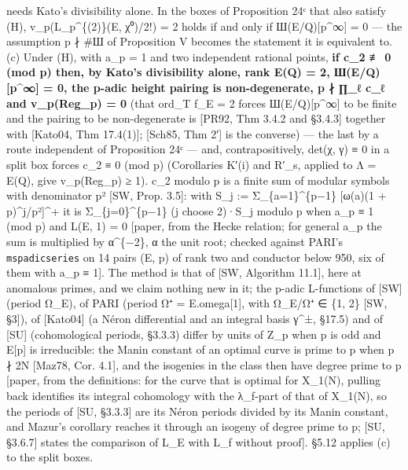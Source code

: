 \documentclass[11pt,a4paper]{article}
\theoremstyle{named}
\begin{document}
needs Kato's divisibility alone. In the boxes of Proposition 24ᶜ that also satisfy (H), v\_p(L\_p\textasciicircum{}\{(2)\}(E, χ⁰)/2!) = 2 holds if and only if Ш(E/Q)[p\textasciicircum{}∞] = 0 — the assumption p ∤ \#Ш of Proposition V becomes the statement it is equivalent to. (c) Under (H), with a\_p = 1 and two independent rational points, \textbf{if c\_2 ≢ 0 (mod p) then, by Kato's divisibility alone, rank E(Q) = 2, Ш(E/Q)[p\textasciicircum{}∞] = 0, the p-adic height pairing is non-degenerate, p ∤ ∏\_ℓ c\_ℓ and v\_p(Reg\_p) = 0} (that ord\_T f\_E = 2 forces Ш(E/Q)[p\textasciicircum{}∞] to be finite and the pairing to be non-degenerate is [PR92, Thm 3.4.2 and §3.4.3] together with [Kato04, Thm 17.4(1)]; [Sch85, Thm 2′] is the converse) — the last by a route independent of Proposition 24ᶜ — and, contrapositively, det(χ, γ) ≡ 0 in a split box forces c\_2 ≡ 0 (mod p) (Corollaries K′(i) and R′\_s, applied to Λ = E(Q), give v\_p(Reg\_p) ≥ 1). c\_2 modulo p is a finite sum of modular symbols with denominator p² [SW, Prop. 3.5]: with S\_j := Σ\_\{a=1\}\textasciicircum{}\{p−1\} [ω(a)(1 + p)\textasciicircum{}j/p²]\textasciicircum{}+ it is Σ\_\{j=0\}\textasciicircum{}\{p−1\} (j choose 2)·S\_j modulo p when a\_p ≡ 1 (mod p) and L(E, 1) = 0 [paper, from the Hecke relation; for general a\_p the sum is multiplied by α\textasciicircum{}\{−2\}, α the unit root; checked against PARI's \texttt{mspadicseries} on 14 pairs (E, p) of rank two and conductor below 950, six of them with a\_p ≡ 1]. The method is that of [SW, Algorithm 11.1], here at anomalous primes, and we claim nothing new in it; the p-adic L-functions of [SW] (period Ω\_E), of PARI (period Ω⁺ = E.omega[1], with Ω\_E/Ω⁺ ∈ \{1, 2\} [SW, §3]), of [Kato04] (a Néron differential and an integral basis γ\textasciicircum{}±, §17.5) and of [SU] (cohomological periods, §3.3.3) differ by units of Z\_p when p is odd and E[p] is irreducible: the Manin constant of an optimal curve is prime to p when p ∤ 2N [Maz78, Cor. 4.1], and the isogenies in the class then have degree prime to p [paper, from the definitions: for the curve that is optimal for X\_1(N), pulling back identifies its integral cohomology with the λ\_f-part of that of X\_1(N), so the periods of [SU, §3.3.3] are its Néron periods divided by its Manin constant, and Mazur's corollary reaches it through an isogeny of degree prime to p; [SU, §3.6.7] states the comparison of L\_E with L\_f without proof]. §5.12 applies (c) to the split boxes.
\end{document}
